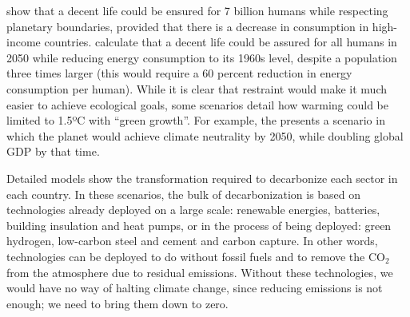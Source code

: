 \documentclass[a5paper,english,openany]{memoir}
\begin{document}
\cite{oneill_good_2018,hickel_is_2019} show that a decent life could be ensured for 7 billion humans while respecting planetary boundaries, provided that %
there is a decrease in consumption in high-income countries. \cite{millward-hopkins_providing_2020} calculate that a decent life could be assured for all humans in 2050 while reducing energy consumption to its 1960s level, despite a population three times larger (this would require a 60 percent reduction in energy consumption per human). While it is clear that restraint %
would make it much easier to achieve ecological goals, some scenarios detail how warming could be limited to 1.5ºC with ``green growth''. For example, the \cite{international_energy_agency_net_2023} presents a scenario in which %
the planet would  %
achieve climate neutrality by 2050, while doubling global GDP by that time. 

Detailed models show the transformation required to decarbonize %
each sector in each country. In these scenarios, the bulk of decarbonization %
is based on technologies already deployed on a large scale: renewable energies, batteries, building insulation and heat pumps, %
or in the process of being deployed: green hydrogen, low-carbon steel and cement and carbon capture. %
In other words, technologies can be deployed to do without fossil fuels and to remove the CO$_\text{2}$ from the atmosphere due to residual emissions. Without these technologies, we would have no way of halting climate change, since reducing emissions is not enough; we need to bring them down to zero. %
\end{document}
